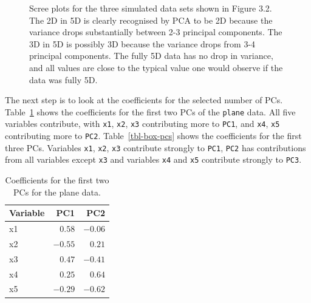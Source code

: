 \documentclass[
  letterpaper,
]{krantz}
\begin{document}
\begin{figure}


\caption{\label{fig-2D-pca}Scree plots for the three simulated data sets
shown in Figure 3.2. The 2D in 5D is clearly recognised by PCA to be 2D
because the variance drops substantially between 2-3 principal
components. The 3D in 5D is possibly 3D because the variance drops from
3-4 principal components. The fully 5D data has no drop in variance, and
all values are close to the typical value one would observe if the data
was fully 5D.}

\end{figure}%

The next step is to look at the coefficients for the selected number of
PCs. Table~\ref{tbl-plane-pcs} shows the coefficients for the first two
PCs of the \texttt{plane} data. All five variables contribute, with
\texttt{x1}, \texttt{x2}, \texttt{x3} contributing more to \texttt{PC1},
and \texttt{x4}, \texttt{x5} contributing more to \texttt{PC2}.
Table~\ref{tbl-box-pcs} shows the coefficients for the first three PCs.
Variables \texttt{x1}, \texttt{x2}, \texttt{x3} contribute strongly to
\texttt{PC1}, \texttt{PC2} has contributions from all variables except
\texttt{x3} and variables \texttt{x4} and \texttt{x5} contribute
strongly to \texttt{PC3}.


\begin{longtable}{lrr}

\caption{\label{tbl-plane-pcs}Coefficients for the first two PCs for the
plane data.}

\tabularnewline

\toprule
Variable & PC1 & PC2 \\ 
\midrule
x1 & $0.58$ & $-0.06$ \\ 
x2 & $-0.55$ & $0.21$ \\ 
x3 & $0.47$ & $-0.41$ \\ 
x4 & $0.25$ & $0.64$ \\ 
x5 & $-0.29$ & $-0.62$ \\ 
\bottomrule

\end{longtable}
\end{document}
